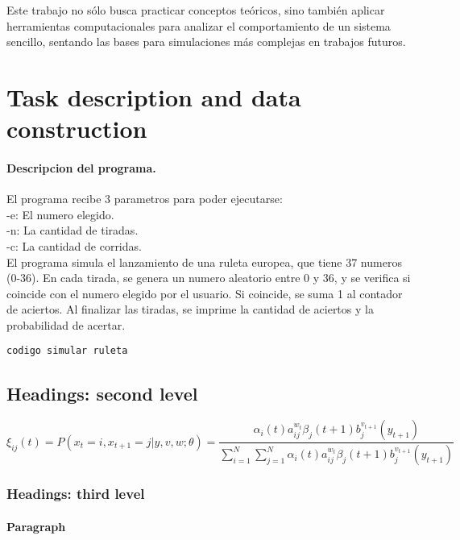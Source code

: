 \documentclass{article}
\begin{document}
Este trabajo no sólo busca practicar conceptos teóricos, sino también aplicar herramientas computacionales para analizar el comportamiento de un sistema sencillo, sentando las bases para simulaciones más complejas en trabajos futuros.


\section{Task description and data construction}
\label{sec:headings}

\paragraph{Descripcion del programa.}
El programa recibe 3 parametros para poder ejecutarse: 
\\-e: El numero elegido. 
\\-n: La cantidad de tiradas. 
\\-c: La cantidad de corridas. 
\\El programa simula el lanzamiento de una ruleta europea, que tiene 37 numeros (0-36). En cada tirada, se genera un numero aleatorio entre 0 y 36, y se verifica si coincide con el numero elegido por el usuario. Si coincide, se suma 1 al contador de aciertos. Al finalizar las tiradas, se imprime la cantidad de aciertos y la probabilidad de acertar.
\\
\begin{verbatim}
codigo simular ruleta
\end{verbatim}

\subsection{Headings: second level}
\lipsum[5]
\begin{equation}
\xi _{ij}(t)=P(x_{t}=i,x_{t+1}=j|y,v,w;\theta)= {\frac {\alpha _{i}(t)a^{w_t}_{ij}\beta _{j}(t+1)b^{v_{t+1}}_{j}(y_{t+1})}{\sum _{i=1}^{N} \sum _{j=1}^{N} \alpha _{i}(t)a^{w_t}_{ij}\beta _{j}(t+1)b^{v_{t+1}}_{j}(y_{t+1})}}
\end{equation}

\subsubsection{Headings: third level}
\lipsum[6]

\paragraph{Paragraph}
\lipsum[7]
\end{document}
